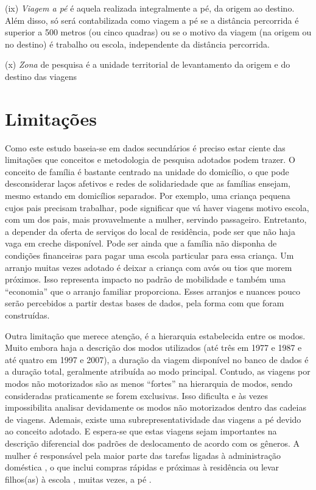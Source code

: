 \begin{compactitem}[]
\item (ix) \emph{Viagem a pé} é aquela realizada integralmente a pé, da origem ao destino. Além disso, só será contabilizada como viagem a pé se a distância percorrida é superior a 500 metros (ou cinco quadras) ou se o motivo da viagem (na origem ou no destino) é trabalho ou escola, independente da distância percorrida.

\item (x) \emph{Zona} de pesquisa é a unidade territorial de levantamento da origem e do destino das viagens
\end{compactitem}

\section{Limitações}\label{sec:limitacoes}

Como este estudo baseia-se em dados secundários é preciso estar ciente das limitações que conceitos e metodologia de pesquisa adotados podem trazer. O conceito de família é bastante centrado na unidade do domicílio, o que pode desconsiderar laços afetivos e redes de solidariedade que as famílias ensejam, mesmo estando em domicílios separados. Por exemplo, uma criança pequena cujos pais precisam trabalhar, pode significar que vá haver viagens motivo escola, com um dos pais, mais provavelmente a mulher, servindo passageiro. Entretanto, a depender da oferta de serviços do local de residência, pode ser que não haja vaga em creche disponível. Pode ser ainda que a família não disponha de  condições financeiras para pagar uma escola particular para essa criança. Um arranjo muitas vezes adotado é deixar a criança com avós ou tios que morem próximos. Isso representa impacto no padrão de mobilidade e também uma ``economia'' que o arranjo familiar proporciona. Esses arranjos e nuances pouco serão percebidos a partir destas bases de dados, pela forma com que foram construídas.

Outra limitação que merece atenção, é a hierarquia estabelecida entre os modos. Muito embora haja a descrição dos modos utilizados (até três em 1977 e 1987 e até quatro em 1997 e 2007), a duração da viagem disponível no banco de dados é a duração total, geralmente atribuída ao modo principal. Contudo, as viagens por modos não motorizados são as menos ``fortes'' na hierarquia de modos, sendo consideradas praticamente se forem exclusivas. Isso dificulta e às vezes impossibilita analisar devidamente os modos não motorizados dentro das cadeias de viagens. 
Ademais, existe uma subrepresentatividade das viagens a pé devido ao conceito adotado. E espera-se que estas viagens sejam importantes na descrição diferencial dos padrões de deslocamento de acordo com os gêneros. A mulher é responsável pela maior parte das tarefas ligadas à administração doméstica \cite{ROOT1999,VANCE2007}, o que inclui compras rápidas e próximas à residência ou levar filhos(as) à escola \cite{FOX1983,FAGNANI1983,IBIPO1992,MCNUCKIN2005,SCHWANEN2002,SONG2003,CRANE2007}, muitas vezes, a pé \cite{VASCONCELLOS2001}.
